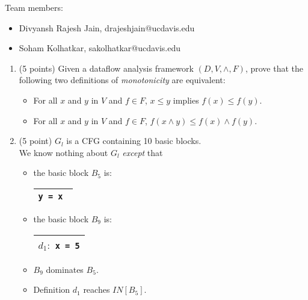 \documentclass[12pt]{article}
\begin{document}
    \begin{mdframed}
      Team members:
      \begin{itemize}
        \item Divyansh Rajesh Jain, drajeshjain@ucdavis.edu %
        \item Soham Kolhatkar, sakolhatkar@ucdavis.edu %
      \end{itemize}
    \end{mdframed}

    \begin{enumerate}


            
        \item (5 points) Given a dataflow analysis framework $(D, V, \wedge, F)$,
        prove that the following two definitions of \emph{monotonicity} are equivalent:
        \begin{itemize}
          \item For all $x$ and $y$ in $V$ and $f \in F$, $x \leq y$ implies $f(x) \leq f(y)$.
          \item For all $x$ and $y$ in $V$ and $f \in F$, $f(x \wedge y) \leq f(x) \wedge f(y)$.
        \end{itemize}

        \begin{mdframed}
          \vspace{2em}
        \end{mdframed}

        \item  (5 point) $G_l$ is a CFG containing 10 basic blocks. \\We know nothing
        about $G_l$ \emph{except} that 
        
        \begin{itemize}
          \item the basic block $B_5$ is:
        \renewcommand{\arraystretch}{1}
        \begin{tabular}{|c|}
          \hline
          \lstinline$y = x $\\
          \hline
        \end{tabular}
        \item the basic block $B_9$ is:
        \renewcommand{\arraystretch}{1}
        \begin{tabular}{|c|}
          \hline
          $d_1: $ \lstinline$x = 5$\\
          \hline
        \end{tabular}
        \item $B_9$ dominates $B_5$.
        \item Definition $d_1$ reaches  $IN[B_5]$.
      \end{itemize}
    

\end{enumerate}
\end{document}
